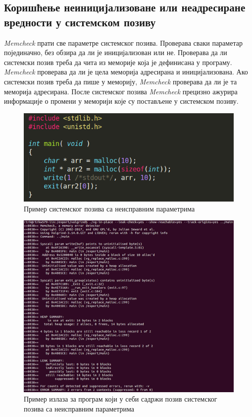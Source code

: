 \documentclass[12pt,oneside]{memoir}
\begin{document}
\subsection{Коришћење неиницијализоване или неадресиране вредности у системском позиву}

\indent \textit{Memcheck} прати све параметре системског позива.  Проверава сваки параметар појединачно, без обзира да ли је иницијализован или не. Проверава да ли системски позив треба да чита из меморије која је дефинисана у програму. \textit{Memcheck} проверава да ли је цела меморија адресирана и иницијализована. Ако системски позив треба да пише у меморију, \textit{Memcheck} проверава да ли је та меморија адресирана. После системског позива \textit{Memcheck} прецизно ажурира информације о промени у меморији које су постављене у системском позиву.

\begin{figure}[h!]
\begin{center}
\includegraphics[scale=0.75]{slika3.png}
\end{center}
\caption{Пример системског позива са неисправним параметрима}
\label{fig:main1}
\end{figure}



\begin{figure}[h!]
\begin{center}
\includegraphics[scale=0.75]{slika4.png}
\end{center}
\caption{Пример излаза за програм који у себи садржи позив системског позива са неисправним параметрима}
\label{fig:memcheck1}
\end{figure}
\end{document}
